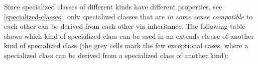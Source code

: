 Since specialized classes of different kinds have different properties,
see \cref{specialized-classes}, only specialized classes that are \emph{in some sense
compatible} to each other can be derived from each other via
inheritance. The following table shows which kind of specialized class
can be used in an extends clause of another kind of specialized class
(the grey cells mark the few exceptional cases, where a specialized
class can be derived from a specialized class of another kind):
\begin{center}
\ifpdf{}
\end{center}
